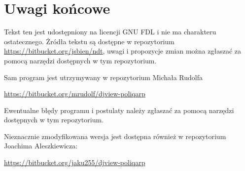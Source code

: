 \documentclass{mwart}
\begin{document}
\section{Uwagi końcowe}
\label{sec:uwagi-kocowe}

Tekst ten jest udostępniony na licencji GNU FDL i nie ma charakteru
ostatecznego. Żródła tekstu są dostępne w repozytorium
\url{https://bitbucket.org/jsbien/ndt}, uwagi i propozycje zmian można
zgłaszać za pomocą narzędzi dostępnych w tym repozytorium.

Sam program jest utrzymywany w repozytorium Michała Rudolfa

\url{https://bitbucket.org/mrudolf/djview-poliqarp}

Ewentualne błędy programu i postulaty należy zgłaszać za pomocą
narzędzi dostępnych w tym repozytorium.

Nieznacznie zmodyfikowana wersja jest dostępna również w 
repozytorium Joachima Aleszkiewicza:

\url{https://bitbucket.org/jaku255/djview-poliqarp}
\end{document}

